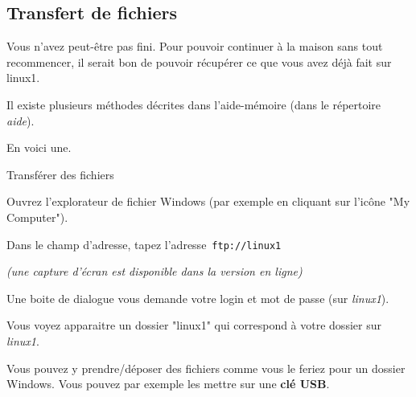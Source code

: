 \documentclass[a4paper,11pt]{article}
\begin{document}
        \subsection{Transfert de fichiers}  
         	Vous n'avez peut-\^etre pas fini. Pour pouvoir continuer \`a la maison sans tout recommencer, 
         	il serait bon de pouvoir r\'ecup\'erer ce que vous avez d\'ej\`a fait sur linux1. \par
				
         	Il existe plusieurs m\'ethodes d\'ecrites dans l'aide-m\'emoire (dans le r\'epertoire \textit{aide}). \par
				
          	En voici une.  \par
				
            	\par
        \begin{Tutoriel}{Transférer des fichiers}
		\begin{steps}
				
			\item Ouvrez l'explorateur de fichier Windows (par exemple en cliquant sur l'ic\^one "My Computer").
			\item Dans le champ d'adresse, tapez l'adresse \,\verb|ftp://linux1|\,\par
				 {\footnotesize\emph{(une capture d'\'ecran est disponible dans la version en ligne)}\par} 
			\item Une boite de dialogue vous demande votre login et mot de passe (sur \textit{linux1}).
			\item Vous voyez apparaitre un dossier "linux1" qui correspond \`a votre dossier sur \textit{linux1}. 
			\item Vous pouvez y prendre/d\'eposer des fichiers comme vous le feriez pour un dossier Windows. 
            			Vous pouvez par exemple les mettre sur une \textbf{cl\'e USB}.
          
		\end{steps}
	\end{Tutoriel}			
				
				
\end{document}
